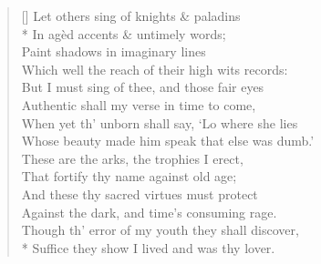\documentclass[MAIN]{subfiles}
\begin{document}
\settowidth{\versewidth}{Let others sing of knights \& paladins}
\begin{verse}[\versewidth]
Let others sing of knights \& paladins\\*
\vin In ag\`ed accents \& untimely words;\\
Paint shadows in imaginary lines\\
\vin Which well the reach of their high wits records:\\
But I must sing of thee, and those fair eyes\\
\vin Authentic shall my verse in time to come,\\
When yet th' unborn shall say, `Lo where she lies\\
\vin Whose beauty made him speak that else was dumb.'\\
These are the arks, the trophies I erect,\\
\vin That fortify thy name against old age;\\
And these thy sacred virtues must protect\\
\vin Against the dark, and time's consuming rage.\\
Though th' error of my youth they shall discover,\\*
Suffice they show I lived and was thy lover.
\end{verse}
\end{document}
